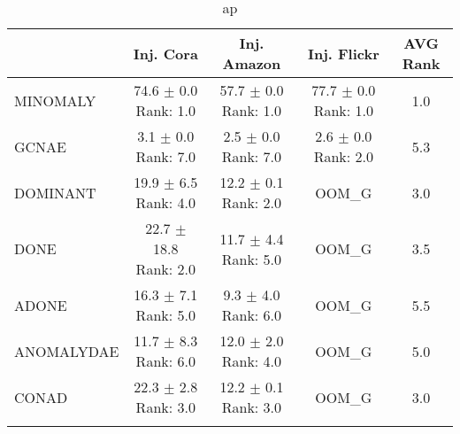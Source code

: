\begin{longtable}{|l|c|c|c|c|}
\hline
 & Inj. Cora & Inj. Amazon & Inj. Flickr & AVG Rank \\ \hline
MINOMALY & \makecell{ 74.6 $\pm$ 0.0 \\ \tiny Rank: 1.0 } & \makecell{ 57.7 $\pm$ 0.0 \\ \tiny Rank: 1.0 } & \makecell{ 77.7 $\pm$ 0.0 \\ \tiny Rank: 1.0 } & 1.0 \\ \hline 
GCNAE & \makecell{ 3.1 $\pm$ 0.0 \\ \tiny Rank: 7.0 } & \makecell{ 2.5 $\pm$ 0.0 \\ \tiny Rank: 7.0 } & \makecell{ 2.6 $\pm$ 0.0 \\ \tiny Rank: 2.0 } & 5.3 \\ \hline 
DOMINANT & \makecell{ 19.9 $\pm$ 6.5 \\ \tiny Rank: 4.0 } & \makecell{ 12.2 $\pm$ 0.1 \\ \tiny Rank: 2.0 } & OOM\_G & 3.0 \\ \hline 
DONE & \makecell{ 22.7 $\pm$ 18.8 \\ \tiny Rank: 2.0 } & \makecell{ 11.7 $\pm$ 4.4 \\ \tiny Rank: 5.0 } & OOM\_G & 3.5 \\ \hline 
ADONE & \makecell{ 16.3 $\pm$ 7.1 \\ \tiny Rank: 5.0 } & \makecell{ 9.3 $\pm$ 4.0 \\ \tiny Rank: 6.0 } & OOM\_G & 5.5 \\ \hline 
ANOMALYDAE & \makecell{ 11.7 $\pm$ 8.3 \\ \tiny Rank: 6.0 } & \makecell{ 12.0 $\pm$ 2.0 \\ \tiny Rank: 4.0 } & OOM\_G & 5.0 \\ \hline 
CONAD & \makecell{ 22.3 $\pm$ 2.8 \\ \tiny Rank: 3.0 } & \makecell{ 12.2 $\pm$ 0.1 \\ \tiny Rank: 3.0 } & OOM\_G & 3.0 \\ \hline 
\caption{ ap } \label{tab:ap}
\end{longtable}
